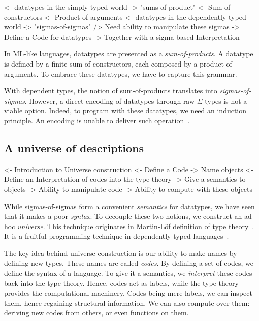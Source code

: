 \begin{wstructure}
<- datatypes in the simply-typed world
    -> "sums-of-product"
        <- Sum of constructors
        <- Product of arguments
<- datatypes in the dependently-typed world
    -> "sigmas-of-sigmas"
    /> Need ability to manipulate these sigmas
        -> Define a Code for datatypes
        -> Together with a sigma-based Interpretation
\end{wstructure}

In ML-like languages, datatypes are presented as a
\emph{sum-of-products}. A datatype is defined by a finite sum of
constructors, each composed by a product of arguments. To embrace
these datatypes, we have to capture this grammar.

With dependent types, the notion of sum-of-products translates into
\emph{sigmas-of-sigmas}. However, a direct encoding of datatypes
through raw $\Sigma$-types is not a viable option. Indeed, to program
with these datatypes, we need an induction principle. An encoding is
unable to deliver such
operation~\cite{geuvers:induction-not-derivable}.


\subsection{A universe of descriptions}
\label{sec:desc-universe}

\begin{wstructure}
<- Introduction to Universe construction
    <- Define a Code
        -> Name objects
    <- Define an Interpretation of codes into the type theory
        -> Give a semantics to objects
    -> Ability to manipulate code
    -> Ability to compute with these objects
\end{wstructure}

While sigmas-of-sigmas form a convenient \emph{semantics} for
datatypes, we have seen that it makes a poor \emph{syntax}. To
decouple these two notions, we construct an ad-hoc
\emph{universe}. This technique originates in Martin-L\"of definition
of type theory~\cite{martin-lof:itt}. It is a fruitful programming
technique in dependently-typed
languages~\cite{benke:universe-generic-prog, oury:power-of-pi}.

The key idea behind universe construction is our ability to make names
by defining new types. These names are called \emph{codes}. By
defining a set of codes, we define the syntax of a language. To give
it a semantics, we \emph{interpret} these codes back into the type
theory. Hence, codes act as labels, while the type theory provides the
computational machinery. Codes being mere labels, we can inspect them,
hence regaining structural information. We can also compute over them:
deriving new codes from others, or even functions on them.

